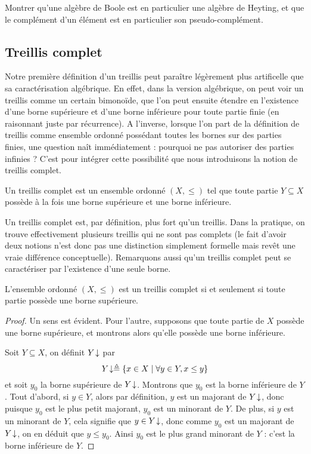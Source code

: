 \begin{exercise}
  Montrer qu'une algèbre de Boole est en particulier une algèbre de Heyting, et
  que le complément d'un élément est en particulier son pseudo-complément.
\end{exercise}

\subsection{Treillis complet}

Notre première définition d'un treillis peut paraître légèrement plus
artificelle que sa caractérisation algébrique. En effet, dans la version
algébrique, on peut voir un treillis comme un certain bimonoïde, que l'on peut
ensuite étendre en l'existence d'une borne supérieure et d'une borne inférieure
pour toute partie finie (en raisonnant juste par récurrence). A l'inverse,
lorsque l'on part de la définition de treillis comme ensemble ordonné possédant
toutes les bornes sur des parties finies, une question naît immédiatement :
pourquoi ne pas autoriser des parties infinies ? C'est pour intégrer cette
possibilité que nous introduisons la notion de treillis complet.

\begin{definition}
  Un treillis complet est un ensemble ordonné $(X,\leq)$ tel que toute partie
  $Y\subseteq X$ possède à la fois une borne supérieure et une borne inférieure.
\end{definition}

Un treillis complet est, par définition, plus fort qu'un treillis. Dans la
pratique, on trouve effectivement plusieurs treillis qui ne sont pas complets
(le fait d'avoir deux notions n'est donc pas une distinction simplement formelle
mais revêt une vraie différence conceptuelle). Remarquons aussi qu'un treillis
complet peut se caractériser par l'existence d'une seule borne.

\begin{property}
  L'ensemble ordonné $(X,\leq)$ est un treillis complet si et seulement si toute
  partie possède une borne supérieure.
\end{property}

\begin{proof}
  Un sens est évident. Pour l'autre, supposons que toute partie de $X$ possède
  une borne supérieure, et montrons alors qu'elle possède une borne inférieure.

  Soit $Y\subseteq X$, on définit $Y\!\downarrow$ par
  \[Y\!\downarrow \triangleq \{x\in X \mid \forall y \in Y, x \leq y\}\]
  et soit $y_0$ la borne supérieure de $Y\!\downarrow$. Montrons que $y_0$ est la
  borne inférieure de $Y$. Tout d'abord, si $y\in Y$, alors par définition,
  $y$ est un majorant de $Y\!\downarrow$, donc puisque $y_0$ est le plus petit
  majorant, $y_0$ est un minorant de $Y$. De plus, si $y$ est un minorant
  de $Y$, cela signifie que $y\in Y\!\downarrow$, donc comme $y_0$ est un majorant de
  $Y\!\downarrow$, on en déduit que $y\leq y_0$. Ainsi $y_0$ est le plus grand
  minorant de $Y$ : c'est la borne inférieure de $Y$.
\end{proof}

